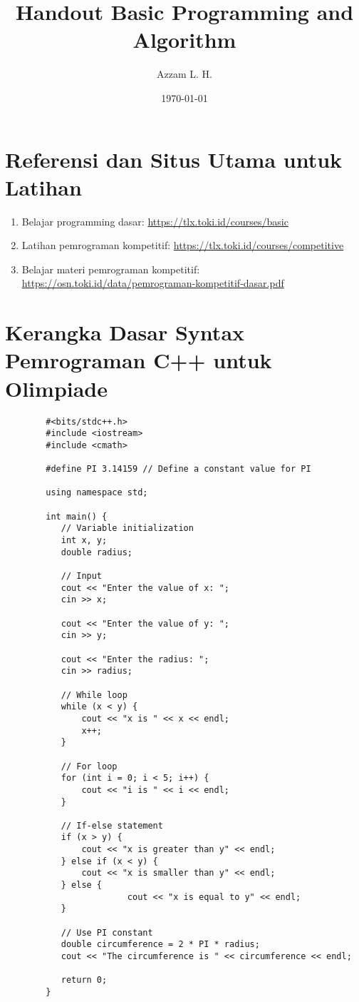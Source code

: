 \documentclass[11pt]{scrartcl}
\begin{document}
	\title{Handout Basic Programming and Algorithm} %
	\date{\today}
	\author{Azzam L. H.}
	\maketitle
	\noindent
	\section{Referensi dan Situs Utama untuk Latihan}
	\begin{enumerate}
	\item Belajar programming dasar: \url{https://tlx.toki.id/courses/basic}
	\item Latihan pemrograman kompetitif: \url{https://tlx.toki.id/courses/competitive}
	\item Belajar materi pemrograman kompetitif: \url{https://osn.toki.id/data/pemrograman-kompetitif-dasar.pdf}
	\end{enumerate}
	
	\section{Kerangka Dasar Syntax Pemrograman C++ untuk Olimpiade}
	\begin{lstlisting}
		#<bits/stdc++.h>
		#include <iostream>
		#include <cmath>
		
		#define PI 3.14159 // Define a constant value for PI
		
		using namespace std;
		
		int main() {
		   // Variable initialization
		   int x, y;
		   double radius;
				
		   // Input
		   cout << "Enter the value of x: ";
		   cin >> x;
				
		   cout << "Enter the value of y: ";
		   cin >> y;
				
		   cout << "Enter the radius: ";
		   cin >> radius;
				
		   // While loop
		   while (x < y) {
		       cout << "x is " << x << endl;
		       x++;
		   }
				
		   // For loop
		   for (int i = 0; i < 5; i++) {
		       cout << "i is " << i << endl;
		   }
				
		   // If-else statement
		   if (x > y) {
		       cout << "x is greater than y" << endl;
		   } else if (x < y) {
		       cout << "x is smaller than y" << endl;
		   } else {
				    	cout << "x is equal to y" << endl;
		   }
				
		   // Use PI constant
		   double circumference = 2 * PI * radius;
		   cout << "The circumference is " << circumference << endl;
				
		   return 0;
		}
		\end{lstlisting}
	
\end{document}
